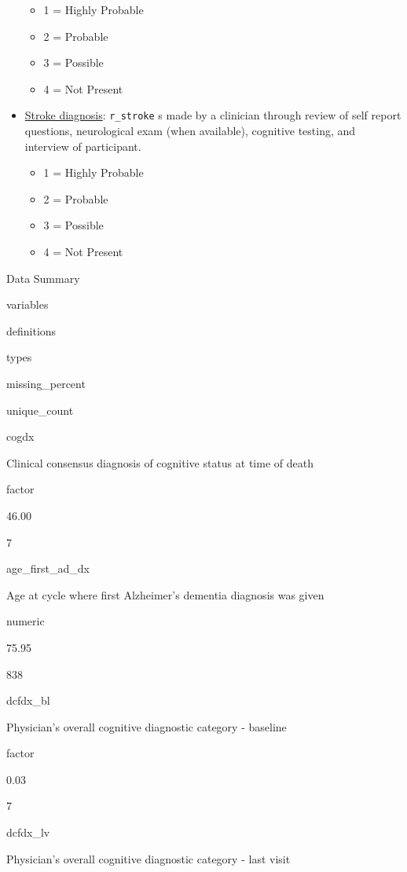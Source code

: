 \documentclass[]{book}
\providecommand{\tightlist}{%
  \setlength{\itemsep}{0pt}\setlength{\parskip}{0pt}}
\begin{document}
\begin{itemize}
  \begin{itemize}
  \tightlist
  \item
    1 = Highly Probable
  \item
    2 = Probable
  \item
    3 = Possible
  \item
    4 = Not Present
  \end{itemize}
\item
  \href{https://www.radc.rush.edu/docs/var/detail.htm?category=Clinical+Diagnosis\&subcategory=Stroke\&variable=r_stroke}{Stroke diagnosis}: \texttt{r\_stroke} s made by a clinician through review of self report questions, neurological exam (when available), cognitive testing, and interview of participant.

  \begin{itemize}
  \tightlist
  \item
    1 = Highly Probable
  \item
    2 = Probable
  \item
    3 = Possible
  \item
    4 = Not Present
  \end{itemize}
\end{itemize}

\label{tab:rosmap-dx}Data Summary

variables

definitions

types

missing\_percent

unique\_count

cogdx

Clinical consensus diagnosis of cognitive status at time of death

factor

46.00

7

age\_first\_ad\_dx

Age at cycle where first Alzheimer's dementia diagnosis was given

numeric

75.95

838

dcfdx\_bl

Physician's overall cognitive diagnostic category - baseline

factor

0.03

7

dcfdx\_lv

Physician's overall cognitive diagnostic category - last visit
\end{document}
